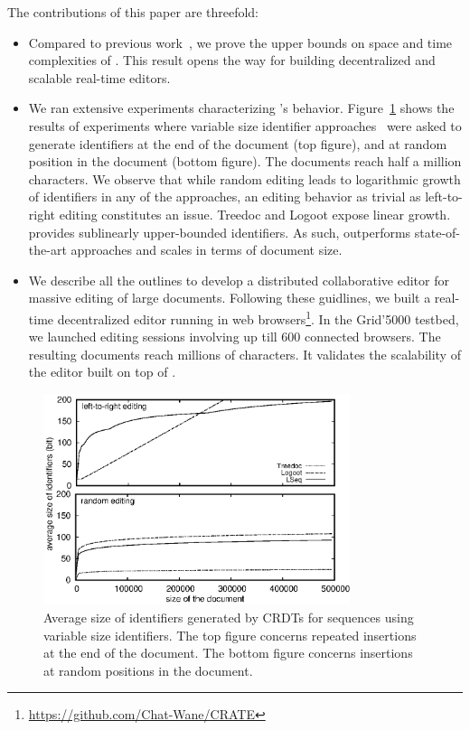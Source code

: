 The contributions of this paper are threefold:
\begin{itemize}
\item Compared to previous work~\cite{nedelec2013concurrency, nedelec2013lseq},
  we prove the upper bounds on space and time complexities of \LSEQ. This result
  opens the way for building decentralized and scalable real-time editors.
\item We ran extensive experiments characterizing \LSEQ's behavior.
  Figure~\ref{fig:complexity} shows the results of experiments where variable
  size identifier approaches~\cite{nedelec2013lseq, preguica2009commutative,
    weiss2009logoot} were asked to generate identifiers at the end of the
  document (top figure), and at random position in the document (bottom
  figure). The documents reach half a million characters. We observe that while
  random editing leads to logarithmic growth of identifiers in any of the
  approaches, an editing behavior as trivial as left-to-right editing
  constitutes an issue. Treedoc and Logoot expose linear growth. \LSEQ provides
  sublinearly upper-bounded identifiers. As such, \LSEQ outperforms
  state-of-the-art approaches and scales in terms of document size.
\item We describe all the outlines to develop a distributed collaborative editor
  for massive editing of large documents. Following these guidlines, we built a
  real-time decentralized editor running in web
  browsers\footnote{\url{https://github.com/Chat-Wane/CRATE}}. In the Grid'5000
  testbed, we launched editing sessions involving up till 600 connected
  browsers. The resulting documents reach millions of characters. It validates
  the scalability of the editor built on top of \LSEQ.
\end{itemize}

\begin{figure}
  \centering
  \includegraphics[width=0.8\textwidth]{img/complexity.eps}
  \caption{\label{fig:complexity} Average size of identifiers generated by CRDTs
    for sequences using variable size identifiers. The top figure concerns
    repeated insertions at the end of the document. The bottom figure concerns
    insertions at random positions in the document.}
\end{figure}

